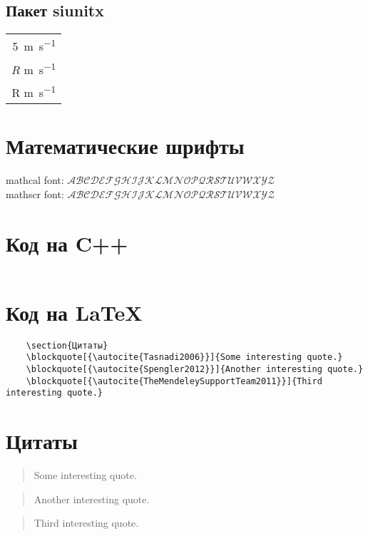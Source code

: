 \subsection{Пакет siunitx}
\begin{tabular}{r}
    \SI{5}{\meter\per\second}\\
    $R$ \si{\meter\per\second}\\
    R \si{\meter\per\second}\\
\end{tabular}

\section{Математические шрифты}

mathcal font: $\mathcal{ABCDEFGHIJKLMNOPQRSTUVWXYZ}$\\
mathscr font: $\mathscr{ABCDEFGHIJKLMNOPQRSTUVWXYZ}$

\section{Код на C++}
\inputminted{c++}{cpp_example.cpp}

\section{Код на \LaTeX}
\begin{verbatim}
    \section{Цитаты}
    \blockquote[{\autocite{Tasnadi2006}}]{Some interesting quote.}
    \blockquote[{\autocite{Spengler2012}}]{Another interesting quote.}
    \blockquote[{\autocite{TheMendeleySupportTeam2011}}]{Third interesting quote.}
\end{verbatim}

\section{Цитаты}
\blockquote[{\autocite{Tasnadi2006}}]{Some interesting quote.}

\blockquote[{\autocite{Spengler2012}}]{Another interesting quote.}

\blockquote[{\autocite{TheMendeleySupportTeam2011}}]{Third interesting quote.}


